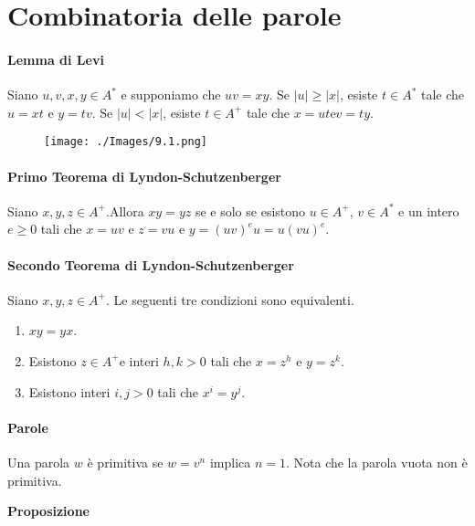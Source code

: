 \chapter{Combinatoria delle parole}

\subsubsection{Lemma di Levi}

Siano $u, v, x, y \in A^{*}$ e supponiamo che $u v=x y .$ Se $|u| \geq|x|$, esiste $t \in A^{*}$ tale che $u=x t$ e $y=t v .$ Se $|u|<|x|$, esiste $t \in A^{+}$ tale che $x=u t $e$ v=ty$.

\begin{figure}[hbpt!]
    \centering
    \texttt{[image: ./Images/9.1.png]}
\end{figure}
\FloatBarrier

\subsubsection{Primo Teorema di Lyndon-Schutzenberger}
Siano $x, y, z \in A^{+} .$Allora $x y=y z$ se e solo se esistono $u \in A^{+}$,
$v \in A^{*}$ e un intero $e \geq 0$ tali che $x=uv $ e $ z=v u $ e 
$y=(u v)^{e} u=u(v u)^{e} .$

\subsubsection{Secondo Teorema di Lyndon-Schutzenberger}

Siano $x, y, z \in A^{+}$. Le seguenti tre condizioni sono equivalenti.
\begin{enumerate}
    \item $x y=y x$.
    \item Esistono $z \in A^{+}$e interi $h, k>0$ tali che $x=z^{h}$ e $y=z^{k}$.
    \item Esistono interi $i, j>0$ tali che $x^{i}=y^{j}$.
\end{enumerate}


\subsubsection{Parole}

Una parola $w$ è primitiva se $w=v^{n}$ implica $n=1$. Nota che la parola vuota non è primitiva.

\vspace{5mm}

\textbf{Proposizione}

